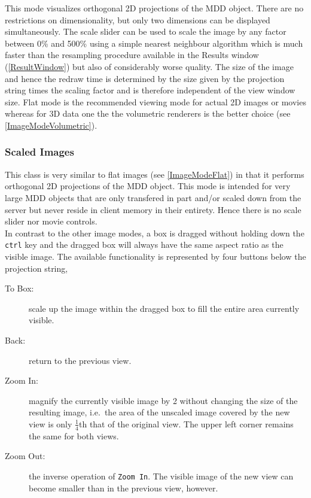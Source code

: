 \documentclass[11pt]{article}
\begin{document}
This mode visualizes orthogonal 2D projections of the MDD object. There are no
restrictions on dimensionality, but only two dimensions can be displayed
simultaneously. The scale slider can be used to scale the image by any factor
between 0\% and 500\% using a simple nearest neighbour algorithm which is
much faster than the resampling procedure available in the Results window
(\ref{ResultWindow}) but also of considerably worse quality. The size of the image
and hence the redraw time is determined by the size given by the projection string
times the scaling factor and is therefore independent of the view window size.
Flat mode is the recommended viewing mode for actual 2D images or movies
whereas for 3D data one the the volumetric renderers is the better choice
(see \ref{ImageModeVolumetric}).


\subsubsection{Scaled Images} \label{ImageModeScaled}

This class is very similar to flat images (see \ref{ImageModeFlat}) in that it
performs orthogonal 2D projections of the MDD object. This mode is intended
for very large MDD objects that are only transfered in part and/or scaled down
from the server but never reside in client memory in their entirety. Hence there
is no scale slider nor movie controls.\\
In contrast to the other image modes, a box is dragged without holding down the
\texttt{ctrl} key and the dragged box will always have the same aspect ratio
as the visible image. The available functionality is represented by four buttons
below the projection string,

\begin{description}
\item[To Box:] scale up the image within the dragged box to fill the entire
area currently visible.
\item[Back:] return to the previous view.
\item[Zoom In:] magnify the currently visible image by 2 without changing the
size of the resulting image, i.e.\ the area of the unscaled image covered by the
new view is only $\frac{1}{4}$th that of the original view. The upper left corner
remains the same for both views.
\item[Zoom Out:] the inverse operation of \texttt{Zoom In}. The visible image
of the new view can become smaller than in the previous view, however.
\end{description}
\end{document}
